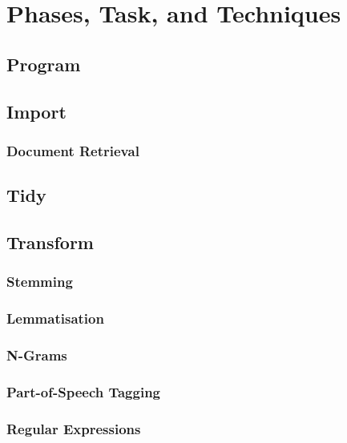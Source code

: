 \documentclass[]{book}
\theoremstyle{definition}
\theoremstyle{definition}
\theoremstyle{definition}
\theoremstyle{remark}
\begin{document}
\section{Phases, Task, and Techniques}\label{sota_tools}

\subsection{Program}\label{sota_tools_program}

\subsection{Import}\label{sota_tools_import}

\subsubsection{Document Retrieval}\label{sota_tools_import_retrieval}

\subsection{Tidy}\label{sota_tools_tidy}

\subsection{Transform}\label{sota_tools_transform}

\subsubsection{Stemming}\label{sota_tools_transform_stemming}

\subsubsection{Lemmatisation}\label{sota_tools_transform_lemmatisation}

\subsubsection{N-Grams}\label{sota_tools_transform_ngrams}

\subsubsection{Part-of-Speech Tagging}\label{sota_tools_transform_pos}

\subsubsection{Regular Expressions}\label{sota_tools_transform_regex}
\end{document}
